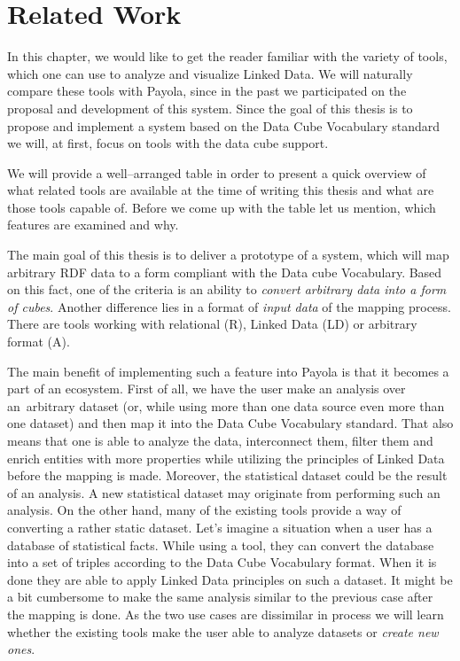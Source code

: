 \chapter{Related Work}
\label{chap:rw}

In this chapter, we would like to get the reader familiar with the variety of tools, which one can
use to analyze and visualize Linked Data. We will naturally compare these tools with
Payola, since in the past we participated on the proposal and development of this system.
Since the goal of this thesis is to propose and implement a system based on the Data Cube Vocabulary
standard we will, at first, focus on tools with the data cube support. 

We will provide a well--arranged table in order to present a quick overview of
what related tools are available at the time of writing this thesis and what are those 
tools capable of. Before we come up with the table let us mention, which
features are examined and why.

The main goal of this thesis is to deliver a prototype of a system, which will map 
arbitrary RDF data to a form compliant with the Data cube Vocabulary. Based on 
this fact, one of the criteria is an ability to \emph{convert arbitrary data 
into a form of cubes}. Another difference lies in a format of \emph{input data} of the
mapping process. There are tools working with relational (R), Linked Data (LD) or
arbitrary format (A).

The main benefit of implementing such a feature into Payola is that it becomes a 
part of an ecosystem. First of all, we have the user make an analysis over an~arbitrary
dataset (or, while using more than one data source even more than one dataset)
and then map it into the Data Cube Vocabulary standard. That also means that one is able
to analyze the data, interconnect them, filter them and enrich entities with more properties
while utilizing the principles of Linked Data before the mapping is made. Moreover, the statistical
dataset could be the result of an analysis. A new statistical dataset may originate from performing
such an analysis. On the other hand, many of the existing 
tools provide a way of converting a rather static dataset. Let's imagine a situation when a 
user has a database of statistical facts. While using a tool, they can 
convert the database into a set of triples according to the Data Cube 
Vocabulary format. When it is done they are able to apply Linked Data principles
on such a dataset. It might be a bit cumbersome to make the same analysis similar to
the previous case after the mapping is done. As the two use cases are dissimilar in process 
we will learn whether the existing tools make the user able to analyze datasets or \emph{create new ones}.

